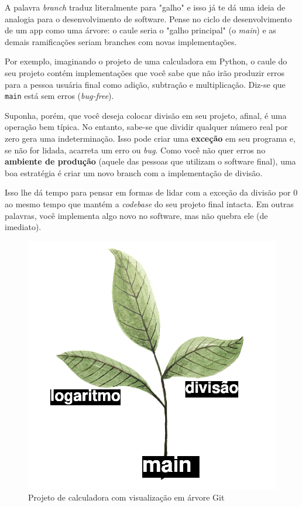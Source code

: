 \documentclass{article}
\begin{document}
	A palavra \textit{branch} traduz literalmente para "galho" e isso já te dá uma ideia de analogia para o desenvolvimento de 
	software. Pense no ciclo de desenvolvimento de um app como uma árvore: o caule seria o "galho principal" (o \textit{main})
	e as demais ramificações seriam branches com novas implementações.

	Por exemplo, imaginando o projeto de uma calculadora em Python, o caule do seu projeto contém implementações que você sabe 
	que não irão produzir erros para a pessoa usuária final como adição, subtração e multiplicação. Diz-se que \texttt{main} 
	está sem erros (\textit{bug-free}).
	
	Suponha, porém, que você deseja colocar divisão em seu projeto, afinal, é uma operação bem típica. No entanto, sabe-se que dividir
	qualquer número real por zero gera uma indeterminação. Isso pode criar uma \textbf{exceção} em seu programa e, se não for lidada, 
	acarreta um erro ou \textit{bug}. Como você não quer erros no \textbf{ambiente de produção} (aquele das pessoas que utilizam o software final),
	uma boa estratégia é criar um novo branch com a implementação de divisão. 

	Isso lhe dá tempo para pensar em formas de lidar com a exceção da divisão por 0 ao mesmo tempo que mantém a \textit{codebase}
	do seu projeto final intacta. Em outras palavras, você implementa algo novo no software, mas não quebra ele (de imediato).

	\begin{figure}[ht!]
		\centering
	  	\includegraphics[scale=0.3]{figs/software_tree.png} 
		\caption*{Projeto de calculadora com visualização em árvore Git}
  \end{figure}
\end{document}
